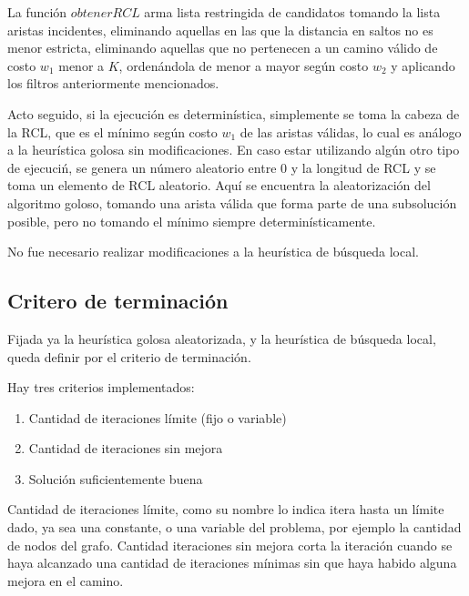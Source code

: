 La funci\'on $obtenerRCL$ arma lista restringida de candidatos tomando la lista aristas incidentes, eliminando aquellas en las que la distancia en saltos no es menor estricta, eliminando aquellas que no pertenecen a un camino v\'alido de costo $w_1$ menor a $K$, orden\'andola de menor a mayor seg\'un costo $w_2$ y aplicando los filtros anteriormente mencionados.

\vspace{2mm}

Acto seguido, si la ejecuci\'on es determin\'istica, simplemente se toma la cabeza de la RCL, que es el m\'inimo seg\'un costo $w_1$ de las aristas v\'alidas, lo cual es an\'alogo a la heur\'istica golosa sin modificaciones. En caso estar utilizando alg\'un otro tipo de ejecuci\'n, se genera un n\'umero aleatorio entre 0 y la longitud de RCL y se toma un elemento de RCL aleatorio. Aqu\'i se encuentra la aleatorizaci\'on del algoritmo goloso, tomando una arista v\'alida que forma parte de una subsoluci\'on posible, pero no tomando el m\'inimo siempre determin\'isticamente.

\vspace{2mm}

No fue necesario realizar modificaciones a la heur\'istica de b\'usqueda local.

\subsection{Critero de terminaci\'on}

Fijada ya la heur\'istica golosa aleatorizada, y la heur\'istica de b\'usqueda local, queda definir por el criterio de terminaci\'on.


\vspace{2mm}

Hay tres criterios implementados:

\begin{enumerate}
\item Cantidad de iteraciones l\'imite (fijo o variable)
\item Cantidad de iteraciones sin mejora
\item Soluci\'on suficientemente buena
\end{enumerate}

Cantidad de iteraciones l\'imite, como su nombre lo indica itera hasta un l\'imite dado, ya sea una constante, o una variable del problema, por ejemplo la cantidad de nodos del grafo. Cantidad iteraciones sin mejora corta la iteraci\'on cuando se haya alcanzado una cantidad de iteraciones m\'inimas sin que haya habido alguna mejora en el camino.

